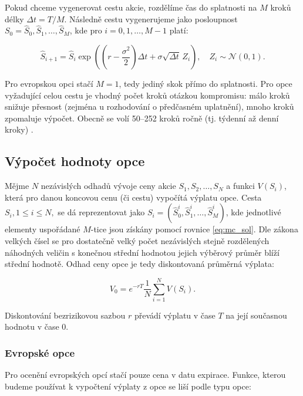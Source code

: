 \documentclass[male,czech,api_bc]{kitheses}
\begin{document}
  Pokud chceme vygenerovat cestu akcie, rozdělíme čas do splatnosti na $M$ kroků délky $\Delta t = T/M$. Následně cestu vygenerujeme jako posloupnost $S_0 = \hat{S}_0, \hat{S}_1, \dots, \hat{S}_M$, kde pro $i = 0, 1, \dots, M-1$ platí:

  \begin{equation}
    \label{eq:mc_sol}
    \hat{S}_{i+1} = \hat{S}_i \exp\!\left( (r - \frac{\sigma^2}{2}) \Delta t + \sigma \sqrt{\Delta t} \, Z_i \right), \quad Z_i \sim \mathcal{N}(0,1).
  \end{equation}

  Pro evropskou opci stačí $M = 1$, tedy jediný skok přímo do splatnosti. Pro opce vyžadující celou cestu je vhodný počet kroků otázkou kompromisu: málo kroků snižuje přesnost (zejména u rozhodování o předčasném uplatnění), mnoho kroků zpomaluje výpočet. Obecně se volí 50--252 kroků ročně (tj. týdenní až denní kroky) \parencites[kapitola~24.3]{McDonald2013}.

  \subsection{Výpočet hodnoty opce}

  Mějme $N$ nezávislých odhadů vývoje ceny akcie $S_1, S_2, \dots, S_N$ a funkci $V(S_i)$, která pro danou koncovou cenu (či cestu) vypočítá výplatu opce. Cesta $S_i, 1 \le i \le N,$ se dá reprezentovat jako $S_i = (\hat{S}_0^i, \hat{S}_1^i, \dots, \hat{S}_M^i)$, kde jednotlivé elementy uspořádané $M$-tice jsou získány pomocí rovnice \eqref{eq:mc_sol}. Dle zákona velkých čísel se pro dostatečně velký počet nezávislých stejně rozdělených náhodných veličin s konečnou střední hodnotou jejich výběrový průměr blíží střední hodnotě. Odhad ceny opce je tedy diskontovaná průměrná výplata:

  \begin{equation}
    V_0 = e^{-rT} \frac{1}{N} \sum_{i=1}^{N} V(S_i).
  \end{equation}

  \parencites[kapitola~1.1]{Glasserman2004}

  Diskontování bezrizikovou sazbou $r$ převádí výplatu v čase $T$ na její současnou hodnotu v čase $0$.

  \subsubsection{Evropské opce}

  Pro ocenění evropských opcí stačí pouze cena v datu expirace. Funkce, kterou budeme používat k vypočtení výplaty z opce se liší podle typu opce:
\end{document}
